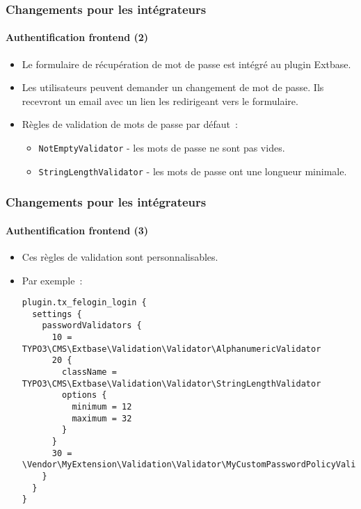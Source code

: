 
\begin{frame}[fragile]
	\frametitle{Changements pour les intégrateurs}
	\framesubtitle{Authentification frontend (2)}

	\begin{itemize}

		\item Le formulaire de récupération de mot de passe est intégré au plugin Extbase.
		\item Les utilisateurs peuvent demander un changement de mot de passe. Ils recevront
			un email avec un lien les redirigeant vers le formulaire.
		\item Règles de validation de mots de passe par défaut~:

			\begin{itemize}
				\item \texttt{NotEmptyValidator} - les mots de passe ne sont pas vides.
				\item \texttt{StringLengthValidator} - les mots de passe ont une longueur minimale.
			\end{itemize}

	\end{itemize}

\end{frame}


\begin{frame}[fragile]
	\frametitle{Changements pour les intégrateurs}
	\framesubtitle{Authentification frontend (3)}

	\lstset{basicstyle=\tiny\ttfamily}

	\begin{itemize}
		\item Ces règles de validation sont personnalisables.
		\item Par exemple~:
\begin{lstlisting}
plugin.tx_felogin_login {
  settings {
    passwordValidators {
      10 = TYPO3\CMS\Extbase\Validation\Validator\AlphanumericValidator
      20 {
        className = TYPO3\CMS\Extbase\Validation\Validator\StringLengthValidator
        options {
          minimum = 12
          maximum = 32
        }
      }
      30 = \Vendor\MyExtension\Validation\Validator\MyCustomPasswordPolicyValidator
    }
  }
}
\end{lstlisting}

	\end{itemize}

\end{frame}

